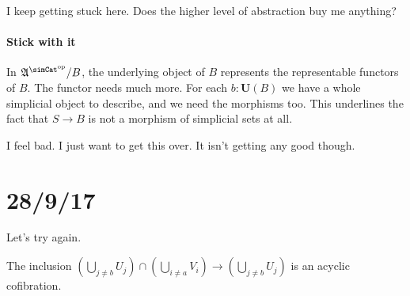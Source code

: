 \documentclass{tac}
\newcommand\dual{^{\mathrm{op}}}
\newcommand\s{^{\simCat\dual}}
\newcommand\of{:}
\newcommand\base{\mathbf{U}}
\newcommand\ambient{\mathfrak A}
\begin{document}
I keep getting stuck here. Does the higher level of abstraction buy me
anything?

\paragraph{Stick with it}
In $\ambient\s/B$, the underlying object of $B$ represents the representable functors of $B$. The functor needs much more. For each $b\of\base(B)$ we have a whole simplicial object to describe, and we need the morphisms too. This underlines the fact that $S\to B$ is not a morphism of simplicial sets at all.

I feel bad. I just want to get this over. It isn't getting any good though.


\section{28/9/17}
Let's try again.

\begin{proposition} The inclusion $(\bigcup_{j\neq b} U_j) \cap (\bigcup_{i\neq a} V_i)\to (\bigcup_{j\neq b} U_j) $ is an acyclic cofibration.
\end{proposition}
\end{document}
